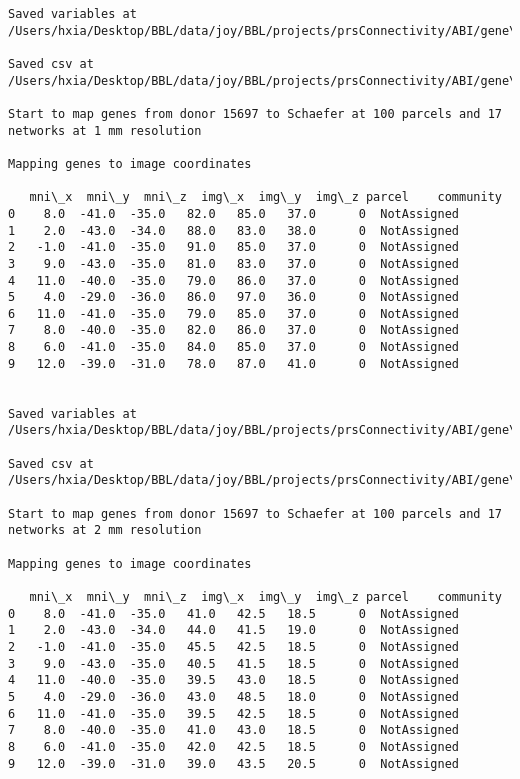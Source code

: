 \documentclass[11pt]{article}
\begin{document}
\begin{Verbatim}[commandchars=\\\{\}]
Saved variables at /Users/hxia/Desktop/BBL/data/joy/BBL/projects/prsConnectivity/ABI/gene\_mapping/15697donor\_100Parcels\_7Network\_2mm.pkl

Saved csv at /Users/hxia/Desktop/BBL/data/joy/BBL/projects/prsConnectivity/ABI/gene\_mapping/15697donor\_100Parcels\_7Network\_2mm.csv

Start to map genes from donor 15697 to Schaefer at 100 parcels and 17 networks at 1 mm resolution

Mapping genes to image coordinates

   mni\_x  mni\_y  mni\_z  img\_x  img\_y  img\_z parcel    community
0    8.0  -41.0  -35.0   82.0   85.0   37.0      0  NotAssigned
1    2.0  -43.0  -34.0   88.0   83.0   38.0      0  NotAssigned
2   -1.0  -41.0  -35.0   91.0   85.0   37.0      0  NotAssigned
3    9.0  -43.0  -35.0   81.0   83.0   37.0      0  NotAssigned
4   11.0  -40.0  -35.0   79.0   86.0   37.0      0  NotAssigned
5    4.0  -29.0  -36.0   86.0   97.0   36.0      0  NotAssigned
6   11.0  -41.0  -35.0   79.0   85.0   37.0      0  NotAssigned
7    8.0  -40.0  -35.0   82.0   86.0   37.0      0  NotAssigned
8    6.0  -41.0  -35.0   84.0   85.0   37.0      0  NotAssigned
9   12.0  -39.0  -31.0   78.0   87.0   41.0      0  NotAssigned


Saved variables at /Users/hxia/Desktop/BBL/data/joy/BBL/projects/prsConnectivity/ABI/gene\_mapping/15697donor\_100Parcels\_17Network\_1mm.pkl

Saved csv at /Users/hxia/Desktop/BBL/data/joy/BBL/projects/prsConnectivity/ABI/gene\_mapping/15697donor\_100Parcels\_17Network\_1mm.csv

Start to map genes from donor 15697 to Schaefer at 100 parcels and 17 networks at 2 mm resolution

Mapping genes to image coordinates

   mni\_x  mni\_y  mni\_z  img\_x  img\_y  img\_z parcel    community
0    8.0  -41.0  -35.0   41.0   42.5   18.5      0  NotAssigned
1    2.0  -43.0  -34.0   44.0   41.5   19.0      0  NotAssigned
2   -1.0  -41.0  -35.0   45.5   42.5   18.5      0  NotAssigned
3    9.0  -43.0  -35.0   40.5   41.5   18.5      0  NotAssigned
4   11.0  -40.0  -35.0   39.5   43.0   18.5      0  NotAssigned
5    4.0  -29.0  -36.0   43.0   48.5   18.0      0  NotAssigned
6   11.0  -41.0  -35.0   39.5   42.5   18.5      0  NotAssigned
7    8.0  -40.0  -35.0   41.0   43.0   18.5      0  NotAssigned
8    6.0  -41.0  -35.0   42.0   42.5   18.5      0  NotAssigned
9   12.0  -39.0  -31.0   39.0   43.5   20.5      0  NotAssigned



\end{Verbatim}
\end{document}
